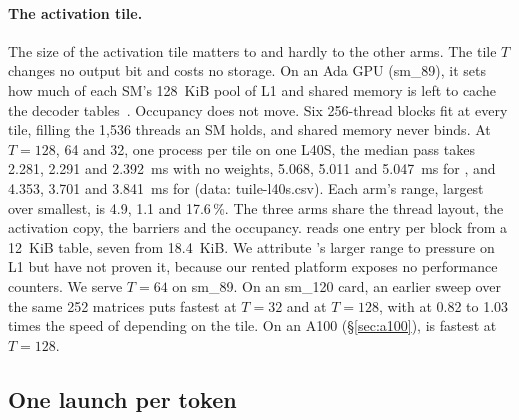 \paragraph{The activation tile.}\label{sec:tile} The size of the activation
tile matters to \Tetra{} and hardly to the other arms. The tile $T$ changes
no output bit and costs no storage. On an Ada GPU (sm\_89), it sets how much of each
SM's 128~KiB pool of L1 and shared memory is left to cache the decoder
tables~\citep{cudaguide}. Occupancy does not move. Six 256-thread blocks fit at
every tile, filling the 1{,}536 threads an SM holds, and shared memory never
binds. At $T = 128$, 64 and 32, one process per tile on one L40S, the median
pass takes 2.281, 2.291 and 2.392~ms with no weights, 5.068, 5.011 and
5.047~ms for \Planes{}, and 4.353, 3.701 and 3.841~ms for \Tetra{} (data:
tuile-l40s.csv). Each arm's range, largest over smallest, is 4.9, 1.1 and
17.6\,\%. The three arms share the thread layout, the activation copy, the
barriers and the occupancy. \Planes{} reads one entry per block from a 12~KiB
table, \Tetra{} seven from 18.4~KiB. We attribute \Tetra{}'s larger range to
pressure on L1 but have not proven it, because our rented platform exposes no
performance counters. We serve $T=64$ on sm\_89. On an sm\_120 card, an
earlier sweep over the same 252 matrices puts \Tetra{} fastest at $T=32$ and
\Planes{} at $T=128$, with \Tetra{} at 0.82 to 1.03 times the speed of
\Planes{} depending on the tile. On an A100 (\S\ref{sec:a100}), \Tetra{} is
fastest at $T=128$.

\subsection{One launch per token}
\label{sec:4e}

